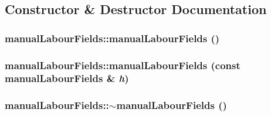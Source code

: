 \subsection{Constructor \& Destructor Documentation}
\hypertarget{classmanual_labour_fields_aeabdab1cf334d123fe11a352c4f8bc33}{
\subsubsection[{manualLabourFields}]{\setlength{\rightskip}{0pt plus 5cm}manualLabourFields::manualLabourFields ()}}
\label{classmanual_labour_fields_aeabdab1cf334d123fe11a352c4f8bc33}
\hypertarget{classmanual_labour_fields_abcd9a37e403784a25de34159eeeb023f}{
\subsubsection[{manualLabourFields}]{\setlength{\rightskip}{0pt plus 5cm}manualLabourFields::manualLabourFields (const {\bf manualLabourFields} \& {\em h})}}
\label{classmanual_labour_fields_abcd9a37e403784a25de34159eeeb023f}
\hypertarget{classmanual_labour_fields_ad3312d15fd806538137091964d612c36}{
\subsubsection[{$\sim$manualLabourFields}]{\setlength{\rightskip}{0pt plus 5cm}manualLabourFields::$\sim$manualLabourFields ()}}
\label{classmanual_labour_fields_ad3312d15fd806538137091964d612c36}


